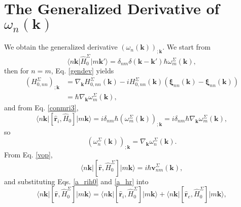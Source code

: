 
\section{The Generalized Derivative of
\texorpdfstring{$\omega_{n}(\mathbf{k})$}{(wn)}}
\label{app:gwk}

We obtain the generalized derivative $(\omega_{n}(\mathbf{k}))_{;\mathbf{k}}$.
We start from
\begin{equation}\label{a_conH0}
\langle n\mathbf{k}\vert \hat{H}^{\Sigma}_{0} \vert m\mathbf{k}'\rangle
= \delta_{nm}\delta(\mathbf{k}-\mathbf{k}')\hbar\omega^{\Sigma}_{m}(\mathbf{k}),
\end{equation}
then for $n = m$, Eq. \eqref{gendev} yields
\begin{align}\label{a_genderH0}
(H^{\Sigma}_{0,nn})_{;\mathbf{k}}
&= \nabla_{\mathbf{k}}H^{\Sigma}_{0,nn}(\mathbf{k})
 - iH^{\Sigma}_{0,nn}(\mathbf{k})
\left(\boldsymbol{\xi}_{nn}(\mathbf{k})
     -\boldsymbol{\xi}_{nn}(\mathbf{k})\right)\nonumber\\
&= \hbar\nabla_{\mathbf{k}}\omega^{\Sigma}_{m}(\mathbf{k}),
\end{align}
and from Eq. \eqref{conmri3}, 
\begin{equation}\label{a_rih0}
\langle n\mathbf{k}\vert
\left[\hat{\mathbf{r}}_i,\hat{H}_{0}\right]
\vert m\mathbf{k}\rangle
= i\delta_{nm}\hbar(\omega^{\Sigma}_{m}(\mathbf{k}))_{;\mathbf{k}}
= i\delta_{nm}\hbar\nabla_{\mathbf{k}}\omega^{\Sigma}_{m}(\mathbf{k}),
\end{equation}
so
\begin{equation}\label{a_wgendev}
\left(\omega^{\Sigma}_{n}(\mathbf{k})\right)_{;\mathbf{k}}
= \nabla_{\mathbf{k}}\omega^{\Sigma}_{n}(\mathbf{k}).
\end{equation}
From Eq. \eqref{vop},
\begin{equation}\label{a_hr}
\langle n\mathbf{k}\vert
\left[\hat{\mathbf{r}},\hat{H}^{\Sigma}_{0}\right]
\vert m\mathbf{k}\rangle
= i\hbar\mathbf{v}^{\Sigma}_{nm}(\mathbf{k}),
\end{equation}
and substituting Eqs. \eqref{a_rih0} and \eqref{a_hr} into
\begin{equation}\label{a_hrt}
\langle n\mathbf{k}\vert
\left[\hat{\mathbf{r}},\hat{H}^{\Sigma}_{0}\right]
\vert m\mathbf{k}\rangle 
= \langle n\mathbf{k}\vert
  \left[\hat{\mathbf{r}}_i,\hat{H}^{\Sigma}_{0}\right]
  \vert m\mathbf{k}\rangle
+ \langle n\mathbf{k}\vert
  \left[\hat{\mathbf{r}}_e,\hat{H}^{\Sigma}_{0}\right]
  \vert m\mathbf{k}\rangle,
\end{equation}
